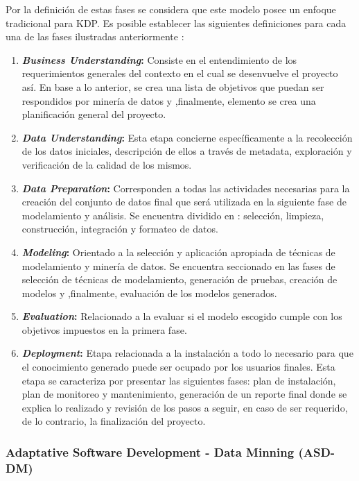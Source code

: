 Por la definición de estas fases se considera que este modelo posee un enfoque tradicional para KDP. Es posible establecer las siguientes definiciones para cada una de las fases ilustradas anteriormente \cite{knowledge_discovery}:

\begin{enumerate}
  \item \textbf{\textit{Business Understanding}:} Consiste en el entendimiento de los requerimientos generales del contexto en el cual se desenvuelve el proyecto así. En base a lo anterior, se crea una lista de objetivos que puedan ser respondidos por minería de datos y ,finalmente, elemento se crea una planificación general del proyecto.
  \item \textbf{\textit{Data Understanding}:} Esta etapa concierne específicamente a la recolección de los datos iniciales, descripción de ellos a través de metadata, exploración y verificación de la calidad de los mismos.
  \item \textbf{\textit{Data Preparation}:} Corresponden a todas las actividades necesarias para la creación del conjunto de datos final que será utilizada en la siguiente fase de modelamiento y análisis. Se encuentra dividido en : selección, limpieza, construcción, integración y formateo de datos.
  \item \textbf{\textit{Modeling}:} Orientado a la selección y aplicación apropiada de técnicas de modelamiento y minería de datos. Se encuentra seccionado en las fases de selección de técnicas de modelamiento, generación de pruebas, creación de modelos y ,finalmente, evaluación de los modelos generados.
  \item \textbf{\textit{Evaluation}:} Relacionado a la evaluar si el modelo escogido cumple con los objetivos impuestos en la primera fase.
  \item \textbf{\textit{Deployment}:} Etapa relacionada a la instalación a todo lo necesario para que el conocimiento generado puede ser ocupado por los usuarios finales. Esta etapa se caracteriza por presentar las siguientes fases: plan de instalación, plan de monitoreo y mantenimiento, generación de un reporte final donde se explica lo realizado y revisión de los pasos a seguir, en caso de ser requerido, de lo contrario, la finalización del proyecto.
\end{enumerate}

\subsubsection{Adaptative Software Development - Data Minning (ASD-DM) \label{asd_dm}}

